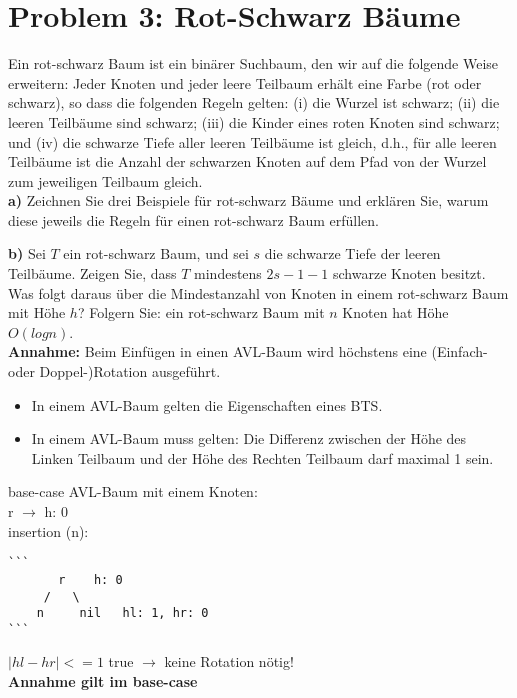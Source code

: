 \section*{{Problem 3: Rot-Schwarz Bäume}} 

Ein rot-schwarz Baum ist ein binärer Suchbaum, den wir auf die folgende Weise erweitern: Jeder Knoten und jeder leere Teilbaum erhält eine Farbe (rot oder schwarz), so dass die folgenden Regeln gelten: (i) die Wurzel ist schwarz; (ii) die leeren Teilbäume sind schwarz; (iii) die Kinder eines roten Knoten sind schwarz; und (iv) die schwarze Tiefe aller leeren Teilbäume ist gleich, d.h., für alle leeren Teilbäume ist die Anzahl der schwarzen Knoten auf dem Pfad von der Wurzel zum jeweiligen Teilbaum gleich.\\

\noindent
\textbf{a)} Zeichnen Sie drei Beispiele für rot-schwarz Bäume und erklären Sie, warum diese jeweils die Regeln für einen rot-schwarz Baum erfüllen.

\noindent
\textbf{b)} Sei $T$ ein rot-schwarz Baum, und sei $s$ die schwarze Tiefe der leeren Teilbäume. Zeigen Sie, dass $T$ mindestens $2s-1 - 1$ schwarze Knoten besitzt. Was folgt daraus über die Mindestanzahl von Knoten in einem rot-schwarz Baum mit Höhe $h$? Folgern Sie: ein rot-schwarz Baum mit $n$ Knoten hat Höhe $O(log n)$.\\

\noindent
\textbf{Annahme:} Beim Einfügen in einen AVL-Baum wird höchstens eine (Einfach- oder Doppel-)Rotation ausgeführt.
\begin{itemize}
	\item In einem AVL-Baum gelten die Eigenschaften eines BTS.
	\item In einem AVL-Baum muss gelten: Die Differenz zwischen der Höhe des Linken Teilbaum und der Höhe des Rechten Teilbaum darf maximal 1 sein.
\end{itemize}

\noindent
base-case AVL-Baum mit einem Knoten: \\
r $\rightarrow$ h: 0 \\

\noindent
insertion (n):
\begin{verbatim}
```
       r 	h: 0
     /   \
    n     nil 	hl: 1, hr: 0
```
\end{verbatim}

$|hl - hr| <= 1$ true $\rightarrow$ keine Rotation nötig!\\
\textbf{Annahme gilt im base-case}\\

